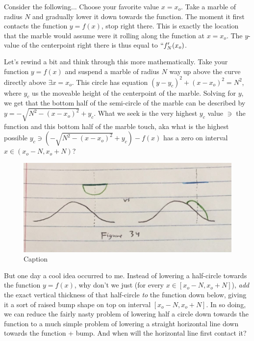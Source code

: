 Consider the following... Choose your favorite value $x = x_o$. Take a marble of radius $N$ and gradually lower it down towards the function. The moment it first contacts the function $y = f(x)$, stop right there. This is exactly the location that the marble would assume were it rolling along the function at $x = x_o$. The $y$-value of the centerpoint right there is thus equal to $``f_N'(x_o)$.

Let's rewind a bit and think through this more mathematically. Take your function $y = f(x)$ and suspend a marble of radius $N$ way up above the curve directly above $\exists x = x_o$. This circle has equation $(y - y_c)^2 + (x - x_o)^2 = N^2$, where $y_c$ us the moveable height of the centerpoint of the marble. Solving for $y$, we get that the bottom half of the semi-circle of the marble can be described by $y = - \sqrt{ N^2 -(x - x_o)^2 } + y_c$. What we seek is the very highest $y_c$ value $\ni$ the function and this bottom half of the marble touch, aka what is the highest possible $y_c \ni (- \sqrt{ N^2 - (x - x_o)^2 } + y_c) - f(x)$ has a zero on interval $x \in (x_o - N, x_o + N)$?

\renewcommand\fw{0.8\linewidth}

\begin{figure}[h]
  \centering
  \label{constructed:2}
  \includegraphics[width=\fw]{img/10-constructed/02.png}
  \caption{Caption}
\end{figure}

But one day a cool idea occurred to me. Instead of lowering a half-circle towards the function $y = f(x)$, why don't we just (for every $x \in [x_o - N, x_o + N]$), \textit{add} the exact vertical thickness of that half-circle \textit{to} the function down below, giving it a sort of raised bump shape on top on interval $[x_o - N, x_o + N]$. In so doing, we can reduce the fairly nasty problem of lowering half a circle down towards the function to a much simple problem of lowering a straight horizontal line down towards the function + bump. And when will the horizontal line first contact it?

